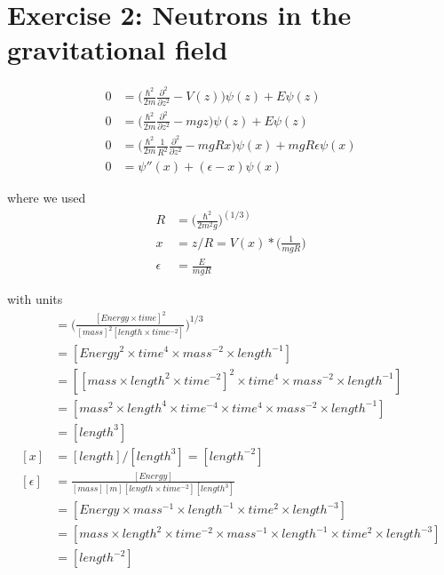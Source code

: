 \documentclass[12pt,a4paper,twoside]{article}
\begin{document}
\section*{Exercise 2: Neutrons in the gravitational field}

\begin{align}
  0 &= \bigg(\frac{\hbar^2}{2m} \frac{\partial^2}{\partial z^2} - V(z) \bigg)
            \psi(z) + E \psi(z)  \\     
  0 &= \bigg(\frac{\hbar^2}{2m} \frac{\partial^2}{\partial z^2} - mgz \bigg)
            \psi(z) + E \psi(z)  \\     
  0 &= \bigg(\frac{\hbar^2}{2m} \frac{1}{R^2} \frac{\partial^2}{\partial z^2} - mgRx \bigg)
            \psi(x) + mgR\epsilon \psi(x)  \\       
  0 &= \psi''(x) + (\epsilon - x) \psi(x)  
  \label{eq:neutron_grav}
\end{align}

where we used
\begin{align}
  R &= \bigg( \frac{\hbar^2}{2m^2g} \bigg) ^(1/3)  \\
  x &= z/R = V(x) * \bigg( \frac{1}{mgR} \bigg)  \\
  \epsilon &= \frac{E}{mgR}  
\end{align}

with units
\begin{align}
  [R] &= \bigg( \frac{[Energy \times time]^2}{[mass]^2 [length \times time^{-2}]} \bigg)^{1/3}  \\
      &= [Energy^2 \times time^4 \times mass^{-2} \times length^{-1}]  \\
      &= [[mass \times length^2 \times time^{-2}]^2 \times time^4 \times mass^{-2} \times length^{-1}]  \\
      &= [mass^2 \times length^4 \times time^{-4} \times time^4 \times mass^{-2} \times length^{-1}]  \\
      &= [length^3]  \\
  [x] &= [length]/[length^3] = [length^{-2}] \\
  [\epsilon] &= \frac{[Energy]}{[mass][m][length \times time^{-2}][length^3]}  \\
             &= [Energy \times mass^{-1} \times length^{-1} \times time^2 \times length^{-3} ] \\
             &= [mass \times length^2 \times time^{-2} \times mass^{-1} \times length^{-1} \times time^2 \times length^{-3}]  \\
             &= [length^{-2}]
\end{align}
\end{document}
